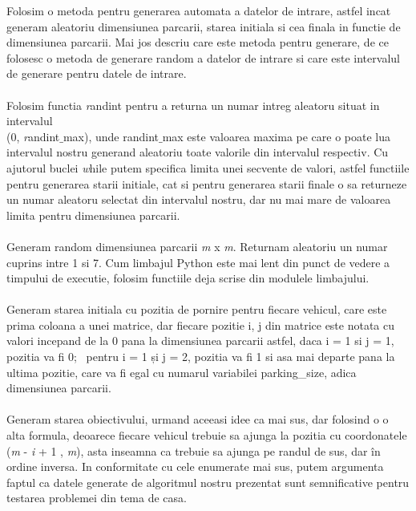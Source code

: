 \documentclass{article}
\begin{document}
\newpage 
\vspace{5cm}
Folosim o metoda pentru generarea automata a datelor de intrare, astfel incat generam aleatoriu dimensiunea parcarii, starea initiala si cea finala in functie de dimensiunea parcarii. Mai jos descriu care este metoda pentru generare, de ce folosesc o metoda de generare random a datelor de intrare si care este intervalul de generare pentru datele de intrare.\\\\

Folosim functia \emph randint pentru a returna un numar intreg aleatoru situat in intervalul\\ (0, \emph randint$\_$max), unde randint$\_$max este valoarea maxima pe care o poate lua intervalul nostru generand aleatoriu toate valorile din intervalul respectiv. Cu ajutorul buclei \emph while putem specifica limita unei secvente de valori, astfel functiile pentru generarea starii initiale, cat si pentru generarea starii finale o sa returneze un numar aleatoru selectat din intervalul nostru, dar nu mai mare de valoarea limita pentru dimensiunea parcarii.\\\\

Generam random dimensiunea parcarii \emph m x \emph m. Returnam aleatoriu un numar cuprins intre 1 si 7. Cum limbajul Python este mai lent din punct de vedere a timpului de executie, folosim functiile deja scrise din modulele limbajului.\\\\ 

Generam starea initiala cu pozitia de pornire pentru fiecare vehicul, care este prima coloana a unei matrice, dar fiecare pozitie i, j din matrice este notata cu valori incepand de la 0 pana la dimensiunea parcarii astfel, daca i = 1 si j = 1, pozitia va fi 0; \ pentru i = 1 și j = 2, pozitia va fi 1 si asa mai departe pana la ultima pozitie, care va fi egal cu numarul variabilei parking\_size, adica dimensiunea parcarii.\\\\

Generam starea obiectivului, urmand aceeasi idee ca mai sus, dar folosind o o alta formula, deoarece fiecare vehicul trebuie sa ajunga la pozitia cu coordonatele 
(\emph m - \emph i + 1 , \emph m), asta inseamna ca trebuie sa ajunga pe randul de sus, dar în ordine inversa. In conformitate cu cele enumerate mai sus, putem argumenta faptul ca datele generate de algoritmul nostru prezentat sunt semnificative pentru testarea problemei din tema de casa.\\\\
\end{document}
